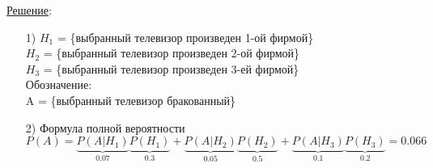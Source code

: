 \underline{Решение}: \\
\begin{enumerate}
	\item[1)]
	$H_1$ = \{выбранный телевизор произведен 1-ой фирмой\} \\
	$H_2$ = \{выбранный телевизор произведен 2-ой фирмой\} \\
	$H_3$ = \{выбранный телевизор произведен 3-ей фирмой\} \\
	Обозначение: \\
	A = \{выбранный телевизор бракованный\}
	
	\item[2)] 
	Формула полной вероятности \\
	$P(A) = \underbrace{P(A|H_1)}_{0.07} \underbrace{P(H_1)}_{0.3} + \underbrace{P(A|H_2)}_{0.05} \underbrace{P(H_2)}_{0.5} + \underbrace{P(A|H_3)}_{0.1} \underbrace{P(H_3)}_{0.2} = 0.066$
\end{enumerate}
















